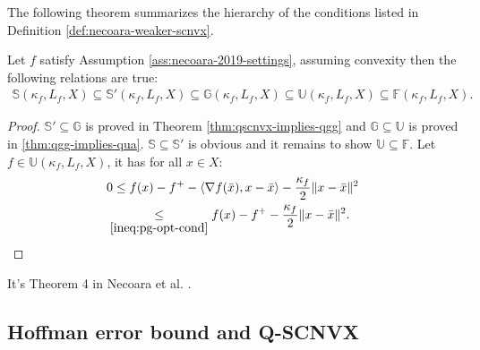 \documentclass[12pt]{report}
\begin{document}
            \par
            The following theorem summarizes the hierarchy of the conditions listed in Definition \ref{def:necoara-weaker-scnvx}. 
            \begin{theorem}\label{thm:q-cnvx-hierarchy}
                Let $f$ satisfy Assumption \ref{ass:necoara-2019-settings}, assuming convexity then the following relations are true: 
                \begin{align*}
                    \mathbb S(\kappa_f, L_f, X) 
                    \subseteq \mathbb S'(\kappa_f, L_f, X)
                    \subseteq \mathbb G(\kappa_f, L_f, X) 
                    \subseteq \mathbb U(\kappa_f, L_f, X) 
                    \subseteq \mathbb F(\kappa_f, L_f, X). 
                \end{align*}
            \end{theorem}
            \begin{proof}
                $\mathbb S' \subseteq \mathbb G$ is proved in Theorem \ref{thm:qscnvx-implies-qgg} and $\mathbb G \subseteq \mathbb U$ is proved in \ref{thm:qgg-implies-qua}. 
                $\mathbb S\subseteq \mathbb S'$ is obvious and it remains to show $\mathbb U \subseteq \mathbb F$. 
                Let $f\in \mathbb U(\kappa_f, L_f, X)$, it has for all $x \in X$: 
                \begin{align*}
                    0 &\le f(x) - f^+ - \langle \nabla f(\bar x), x - \bar x\rangle - \frac{\kappa_f}{2}\Vert x - \bar x\Vert^2
                    \\
                    &\hspace{-0.5em}\underset{\eqref{ineq:pg-opt-cond}}{\le} 
                    f(x) - f^+ - \frac{\kappa_f}{2}\Vert x - \bar x\Vert^2. 
                \end{align*}
            \end{proof}
            \begin{remark}
                It's Theorem 4 in Necoara et al. \cite{necoara_linear_2019}.
            \end{remark}
        \subsection{Hoffman error bound and Q-SCNVX}
\end{document}
